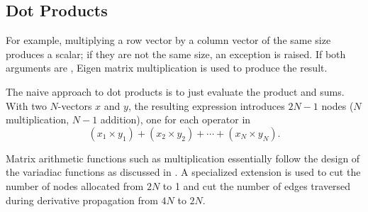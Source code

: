 \documentclass[10pt]{article}
\begin{document}
\subsection{Dot Products}

For example, multiplying a row vector by a column vector of the same
size produces a scalar; if they are not the same size, an exception is
raised.  If both arguments are , Eigen matrix
multiplication is used to produce the result.  

The naive approach to dot products is to just evaluate the product and
sums.  With two $N$-vectors $x$ and $y$, the resulting expression
introduces $2N - 1$ nodes ($N$ multiplication, $N-1$ addition), one
for each operator in
\[
\left( x_1 \times y_1 \right)
+ \left( x_2 \times y_2 \right) 
+ \cdots +
\left( x_N \times y_N \right).
\]

Matrix arithmetic functions such as multiplication essentially follow
the design of the variadiac functions as discussed in
.   A specialized  extension
is used to cut the number of nodes allocated from $2N$ to 1 and cut the
number of edges traversed during derivative propagation from $4N$ to $2N$.  
\end{document}
